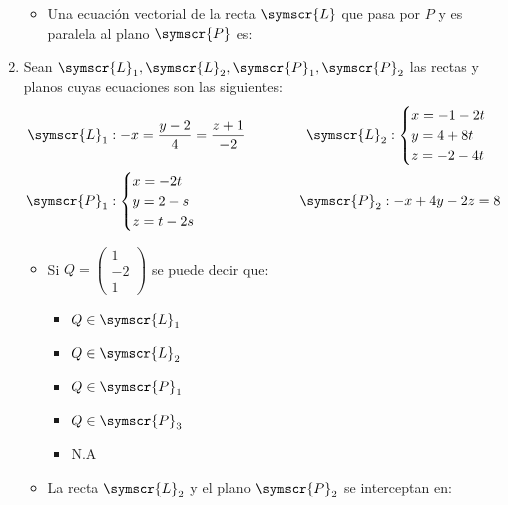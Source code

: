 \documentclass{article}
\def\fancyL{\symscr{L}}
\def\fancyP{\symscr{P}}
\begin{document}
\begin{enumerate}
\begin{itemize}
\begin{enumerate}
                \end{enumerate}
            \item Una ecuación vectorial de la recta \(\fancyL\) que pasa por \(P\) y es paralela al plano \(\fancyP\) es:
        \end{itemize}
\setcounter{enumi}{20}
\item Sean \(\fancyL_1, \fancyL_2, \fancyP_1, \fancyP_2\) las rectas y planos cuyas ecuaciones son las siguientes:
    \[
        \begin{aligned}
            \fancyL_1 &: -x = \frac{y - 2}{4} = \frac{z + 1}{-2}
            \hspace{1cm}
            &\fancyL_2: 
            \begin{cases}
                x = -1 -2t \\
                y = 4 +8t \\ 
                z = -2 -4t \\
            \end{cases} 
            \\
            \fancyP_1 &:
            \begin{cases}
                x = -2t \\
                y = 2 - s \\
                z = t - 2s
            \end{cases}
            \hspace{1cm}
            &\fancyP_2: -x + 4y - 2z = 8
            \\
        \end{aligned}
    \]
    \begin{itemize}
        \item Si \(Q = \left(\begin{smallmatrix}1 \\ −2 \\ 1\end{smallmatrix}\right)\) se puede decir que:
            \begin{itemize}
                \item \(Q \in \fancyL_1\)
                \item \(Q \in \fancyL_2\)
                \item \(Q \in \fancyP_1\)
                \item \(Q \in \fancyP_3\)
                \item N.A
            \end{itemize}
        \item La recta \(\fancyL_2\) y el plano \(\fancyP_2\) se interceptan en:

\end{itemize}
\end{enumerate}
\end{document}
